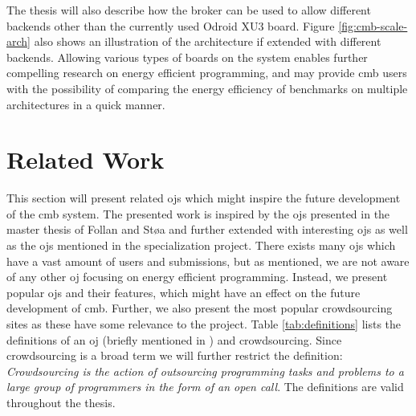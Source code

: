 The thesis will also describe how the broker can be used to allow different backends other than the currently used Odroid XU3 board. Figure \ref{fig:cmb-scale-arch} also shows an illustration of the architecture if extended with different backends. Allowing various types of boards on the system enables further compelling research on energy efficient programming, and may provide \gls{cmb} users with the possibility of comparing the energy efficiency of benchmarks on multiple architectures in a quick manner.

\section{Related Work}
\label{sec:related}
This section will present related \glspl{oj} which might inspire the future development of the \gls{cmb} system. The presented work is inspired by the \glspl{oj} presented in the master thesis of Follan and Støa and further extended with interesting \glspl{oj} as well as the \glspl{oj} mentioned in the specialization project. There exists many \glspl{oj} which have a vast amount of users and submissions, but as mentioned, we are not aware of any other \gls{oj} focusing on energy efficient programming. Instead, we present popular \glspl{oj} and their features, which might have an effect on the future development of \gls{cmb}. Further, we also present the most popular crowdsourcing sites as these have some relevance to the project. Table \ref{tab:definitions} lists the definitions of an \gls{oj} (briefly mentioned in ) and crowdsourcing. Since crowdsourcing is a broad term we will further restrict the definition: \textit{Crowdsourcing is the action of outsourcing programming tasks and problems to a large group of programmers in the form of an open call}. The definitions are valid throughout the thesis. \\

